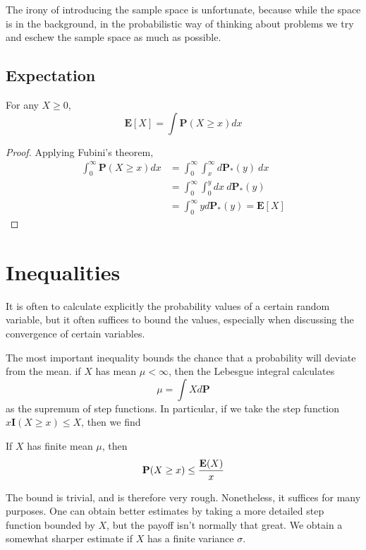 The irony of introducing the sample space is unfortunate, because while the space is in the background, in the probabilistic way of thinking about problems we try and eschew the sample space as much as possible.

\section{Expectation}

\begin{theorem}
    For any $X \geq 0$,
    \[ \mathbf{E}[X] = \int \mathbf{P}(X \geq x) dx \]
\end{theorem}
\begin{proof}
    Applying Fubini's theorem,
    \begin{align*}
        \int_0^\infty \mathbf{P}(X \geq x) dx &= \int_0^\infty \int_x^\infty d \mathbf{P}_*(y)\ dx\\
        &= \int_0^\infty \int_0^y dx\ d\mathbf{P}_*(y)\\
        &= \int_0^\infty y d\mathbf{P}_*(y) = \mathbf{E}[X]
    \end{align*}
\end{proof}

\chapter{Inequalities}

It is often to calculate explicitly the probability values of a certain random variable, but it often suffices to bound the values, especially when discussing the convergence of certain variables.

The most important inequality bounds the chance that a probability will deviate from the mean. if $X$ has mean $\mu < \infty$, then the Lebesgue integral calculates
%
\[ \mu = \int X d\mathbf{P} \]
%
as the supremum of step functions. In particular, if we take the step function $x \mathbf{I}(X \geq x) \leq X$, then we find

\begin{theorem}
    If $X$ has finite mean $\mu$, then
    \[ \operatorname{\mathbf{P}}(X \geq x) \leq \frac{\mathbf{E}(X)}{x} \]
\end{theorem}

The bound is trivial, and is therefore very rough. Nonetheless, it suffices for many purposes. One can obtain better estimates by taking a more detailed step function bounded by $X$, but the payoff isn't normally that great. We obtain a somewhat sharper estimate if $X$ has a finite variance $\sigma$.

